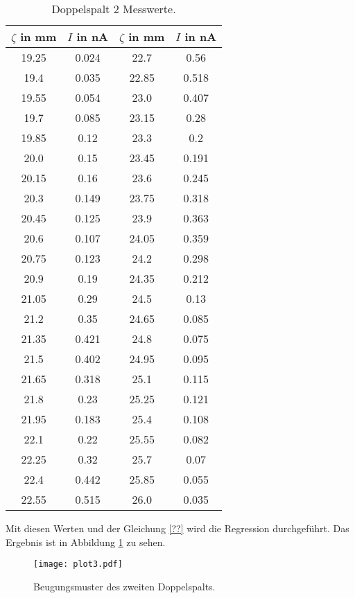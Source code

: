 \begin{table}
  \centering
  \caption{Doppelspalt 2 Messwerte.}
  \label{tab:doppel2}
\begin{tabular}{c c | c c}
  \toprule
  $\zeta$ in mm & $I$ in nA & $\zeta$ in mm & $I$ in nA \\
  \midrule
  19.25  &  0.024  &  22.7  &  0.56 \\
  19.4  &  0.035  &  22.85  &  0.518 \\
  19.55  &  0.054  &  23.0  &  0.407 \\
  19.7  &  0.085  &  23.15  &  0.28 \\
  19.85  &  0.12  &  23.3  &  0.2 \\
  20.0  &  0.15  &  23.45  &  0.191 \\
  20.15  &  0.16  &  23.6  &  0.245 \\
  20.3  &  0.149  &  23.75  &  0.318 \\
  20.45  &  0.125  &  23.9  &  0.363 \\
  20.6  &  0.107  &  24.05  &  0.359 \\
  20.75  &  0.123  &  24.2  &  0.298 \\
  20.9  &  0.19  &  24.35  &  0.212 \\
  21.05  &  0.29  &  24.5  &  0.13 \\
  21.2  &  0.35  &  24.65  &  0.085 \\
  21.35  &  0.421  &  24.8  &  0.075 \\
  21.5  &  0.402  &  24.95  &  0.095 \\
  21.65  &  0.318  &  25.1  &  0.115 \\
  21.8  &  0.23  &  25.25  &  0.121 \\
  21.95  &  0.183  &  25.4  &  0.108 \\
  22.1  &  0.22  &  25.55  &  0.082 \\
  22.25  &  0.32  &  25.7  &  0.07 \\
  22.4  &  0.442  &  25.85  &  0.055 \\
  22.55  &  0.515  &  26.0  &  0.035 \\
  \bottomrule
\end{tabular}
\end{table}
\FloatBarrier

Mit diesen Werten und der Gleichung \eqref{??} wird die Regression durchgeführt.
Das Ergebnis ist in Abbildung \ref{fig:plot3} zu sehen.

\begin{figure}
  \centering
  \texttt{[image: plot3.pdf]}
  \caption{Beugungsmuster des zweiten Doppelspalts.}
  \label{fig:plot3}
\end{figure}
\FloatBarrier


